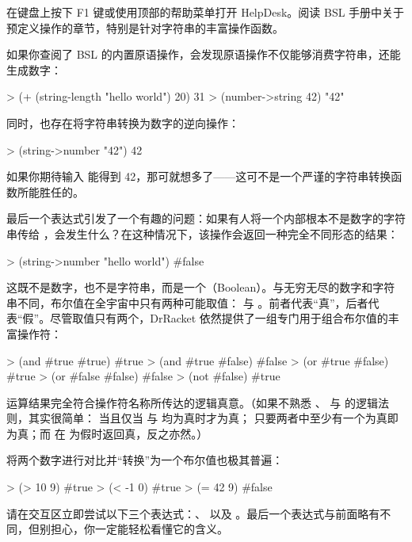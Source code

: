 \begin{notebox}[使用 HelpDesk]
在键盘上按下 F1 键或使用顶部的帮助菜单打开 HelpDesk。阅读 BSL 手册中关于预定义操作的章节，特别是针对字符串的丰富操作函数。
\end{notebox}

如果你查阅了 BSL 的内置原语操作，会发现原语操作不仅能够消费字符串，还能生成数字：
\begin{replbox}
> (+ (string-length "hello world") 20)
31
> (number->string 42)
"42"
\end{replbox}
同时，也存在将字符串转换为数字的逆向操作：
\begin{replbox}
> (string->number "42")
42
\end{replbox}
如果你期待输入  能得到 42，那可就想多了——这可不是一个严谨的字符串转换函数所能胜任的。

最后一个表达式引发了一个有趣的问题：如果有人将一个内部根本不是数字的字符串传给 ，会发生什么？在这种情况下，该操作会返回一种完全不同形态的结果：
\begin{replbox}
> (string->number "hello world")
#false
\end{replbox}
这既不是数字，也不是字符串，而是一个（Boolean）。与无穷无尽的数字和字符串不同，布尔值在全宇宙中只有两种可能取值： 与 。前者代表“真”，后者代表“假”。尽管取值只有两个，DrRacket 依然提供了一组专门用于组合布尔值的丰富操作符：
\begin{replbox}
> (and #true #true)
#true
> (and #true #false)
#false
> (or #true #false)
#true
> (or #false #false)
#false
> (not #false)
#true
\end{replbox}
运算结果完全符合操作符名称所传达的逻辑真意。（如果不熟悉 、 与  的逻辑法则，其实很简单： 当且仅当  与  均为真时才为真； 只要两者中至少有一个为真即为真；而  在  为假时返回真，反之亦然。）

将两个数字进行对比并“转换”为一个布尔值也极其普遍：
\begin{replbox}
> (> 10 9)
#true
> (< -1 0)
#true
> (= 42 9)
#false
\end{replbox}

\begin{notebox}[停下来动手试一试]
请在交互区立即尝试以下三个表达式：、 以及 。最后一个表达式与前面略有不同，但别担心，你一定能轻松看懂它的含义。
\end{notebox}

